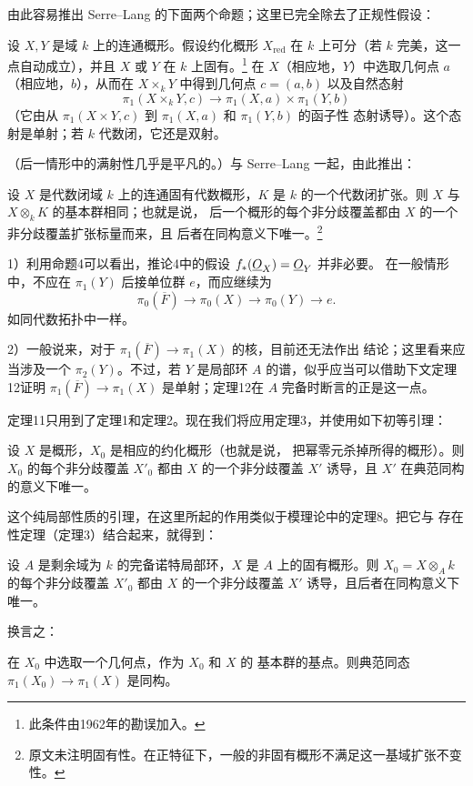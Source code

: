 由此容易推出 Serre--Lang 的下面两个命题；这里已完全除去了正规性假设：

 设 $X,Y$ 是域 $k$ 上的连通概形。假设约化概形
$X_{\mathrm{red}}$ 在 $k$ 上可分（若 $k$ 完美，这一点自动成立），并且
$X$ 或 $Y$ 在 $k$ 上固有。\footnote{此条件由1962年的勘误加入。} 在
$X$（相应地，$Y$）中选取几何点 $a$（相应地，$b$），从而在
$X\times_kY$ 中得到几何点 $c=(a,b)$ 以及自然态射
\[
  \pi_1(X\times_kY,c)\longrightarrow
  \pi_1(X,a)\times\pi_1(Y,b)
\]
（它由从 $\pi_1(X\times Y,c)$ 到 $\pi_1(X,a)$ 和 $\pi_1(Y,b)$ 的函子性
态射诱导）。这个态射是单射；若 $k$ 代数闭，它还是双射。

（后一情形中的满射性几乎是平凡的。）与 Serre--Lang 一起，由此推出：

 设 $X$ 是代数闭域 $k$ 上的连通固有代数概形，$K$ 是 $k$
的一个代数闭扩张。则 $X$ 与 $X\otimes_kK$ 的基本群相同；也就是说，
后一个概形的每个非分歧覆盖都由 $X$ 的一个非分歧覆盖扩张标量而来，且
后者在同构意义下唯一。\footnote{原文未注明固有性。在正特征下，一般的非固有概形不满足这一基域扩张不变性。}


1）利用命题4可以看出，推论4中的假设 $f_*(\underline{O}_X)=\underline{O}_Y$ 并非必要。
在一般情形中，不应在 $\pi_1(Y)$ 后接单位群 $e$，而应继续为
\[
  \pi_0(\overline F)\longrightarrow\pi_0(X)
  \longrightarrow\pi_0(Y)\longrightarrow e.
\]
如同代数拓扑中一样。

2）一般说来，对于
$\pi_1(\overline F)\longrightarrow\pi_1(X)$ 的核，目前还无法作出
结论；这里看来应当涉及一个 $\pi_2(Y)$。不过，若 $Y$ 是局部环 $A$
的谱，似乎应当可以借助下文定理12证明
$\pi_1(\overline F)\longrightarrow\pi_1(X)$ 是单射；定理12在 $A$
完备时断言的正是这一点。

定理11只用到了定理1和定理2。现在我们将应用定理3，并使用如下初等引理：

 设 $X$ 是概形，$X_0$ 是相应的约化概形（也就是说，
把幂零元杀掉所得的概形）。则 $X_0$ 的每个非分歧覆盖 $X'_0$ 都由
$X$ 的一个非分歧覆盖 $X'$ 诱导，且 $X'$ 在典范同构的意义下唯一。

这个纯局部性质的引理，在这里所起的作用类似于模理论中的定理8。把它与
存在性定理（定理3）结合起来，就得到：

 设 $A$ 是剩余域为 $k$ 的完备诺特局部环，$X$ 是
$A$ 上的固有概形。则 $X_0=X\otimes_Ak$ 的每个非分歧覆盖 $X'_0$
都由 $X$ 的一个非分歧覆盖 $X'$ 诱导，且后者在同构意义下唯一。

换言之：

 在 $X_0$ 中选取一个几何点，作为 $X_0$ 和 $X$ 的
基本群的基点。则典范同态
$\pi_1(X_0)\longrightarrow\pi_1(X)$ 是同构。

